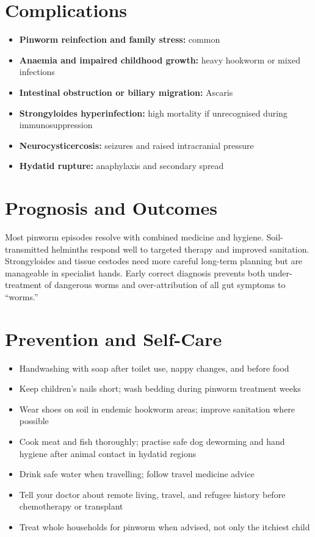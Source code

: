 \section*{Complications}
\begin{itemize}
    \item \textbf{Pinworm reinfection and family stress:} common
    \item \textbf{Anaemia and impaired childhood growth:} heavy hookworm or mixed infections
    \item \textbf{Intestinal obstruction or biliary migration:} Ascaris
    \item \textbf{Strongyloides hyperinfection:} high mortality if unrecognised during immunosuppression
    \item \textbf{Neurocysticercosis:} seizures and raised intracranial pressure
    \item \textbf{Hydatid rupture:} anaphylaxis and secondary spread
\end{itemize}

\section*{Prognosis and Outcomes}
Most pinworm episodes resolve with combined medicine and hygiene. Soil-transmitted helminths respond well to targeted therapy and improved sanitation. Strongyloides and tissue cestodes need more careful long-term planning but are manageable in specialist hands. Early correct diagnosis prevents both under-treatment of dangerous worms and over-attribution of all gut symptoms to ``worms.''

\section*{Prevention and Self-Care}
\begin{itemize}
    \item Handwashing with soap after toilet use, nappy changes, and before food
    \item Keep children's nails short; wash bedding during pinworm treatment weeks
    \item Wear shoes on soil in endemic hookworm areas; improve sanitation where possible
    \item Cook meat and fish thoroughly; practise safe dog deworming and hand hygiene after animal contact in hydatid regions
    \item Drink safe water when travelling; follow travel medicine advice
    \item Tell your doctor about remote living, travel, and refugee history before chemotherapy or transplant
    \item Treat whole households for pinworm when advised, not only the itchiest child
\end{itemize}

